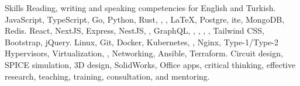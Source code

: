 \begin{rubric}{Skills}
	\entry*[Language]
		Reading, writing and speaking competencies for English and Turkish.
		JavaScript, TypeScript, Go, Python, Rust, , , \LaTeX,
	\entry*[Database]
		Postgre, ite, MongoDB, Redis.
		React, NextJS, Express, NestJS, , GraphQL, , , , , Tailwind CSS, Bootstrap, jQuery.
	\entry*[Systems]
		Linux, Git, Docker, Kubernetes, , Nginx, Type-1/Type-2 Hypervisors, Virtualization, , Networking, Ansible, Terraform.
	\entry*[Misc.]
		Circuit design, SPICE simulation, 3D design, SolidWorks, Office apps, critical thinking, effective research, teaching, training, consultation, and mentoring.
\end{rubric}
